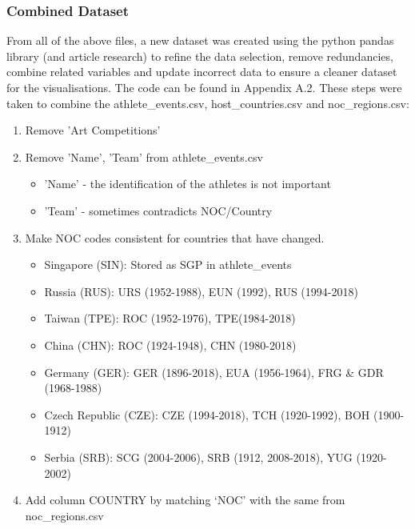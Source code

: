 \documentclass[a4 paper, 12pt]{article}
\begin{document}
    \subsubsection{Combined Dataset}
    From all of the above files, a new dataset was created using the python pandas library (and article research) to refine the data selection, remove redundancies, combine related variables and update incorrect data to ensure a cleaner dataset for the visualisations. The code can be found in Appendix A.2. These steps were taken to combine the athlete\_events.csv, host\_countries.csv and noc\_regions.csv:
        \begin{enumerate}
            \item Remove 'Art Competitions' 
            \item Remove 'Name', 'Team' from athlete\_events.csv
                \begin{itemize}
                    \item 'Name' - the identification of the athletes is not important
                    \item 'Team' - sometimes contradicts NOC/Country
                \end{itemize}            
            \item Make NOC codes consistent for countries that have changed.            
               \begin{itemize}
                    \item Singapore (SIN): Stored as SGP in athlete\_events
                    \item Russia (RUS): URS (1952-1988), EUN (1992), RUS (1994-2018)
                    \item Taiwan (TPE): ROC (1952-1976), TPE(1984-2018)
                    \item China (CHN): ROC (1924-1948), CHN (1980-2018)
                    \item Germany (GER): GER (1896-2018), EUA (1956-1964), FRG \& GDR (1968-1988)
                    \item Czech Republic (CZE): CZE (1994-2018), TCH (1920-1992), BOH (1900-1912)
                    \item Serbia (SRB): SCG (2004-2006), SRB (1912, 2008-2018), YUG (1920-2002)
                \end{itemize}            
            \item Add column COUNTRY by matching ‘NOC’ with the same from noc\_regions.csv

\end{enumerate}
\end{document}
